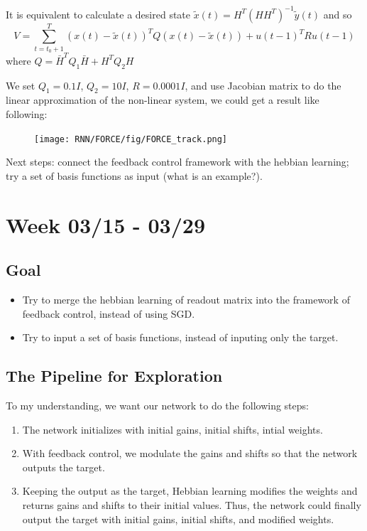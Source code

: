 \documentclass[12pt, a4paper]{article}
\begin{document}
It is equivalent to calculate a desired state $\tilde{x}(t) = H^T(HH^{T})^{-1}\tilde{y}(t)$ and so $$V = \sum_{t=t_0+1}^T (x(t) - \tilde{x}(t))^T Q (x(t)- \tilde{x}(t)) + u(t-1)^T R u(t-1)$$ where $Q=\bar{H}^T Q_1 \bar{H} + H^T Q_2 H$

We set $Q_1 = 0.1I$, $Q_2 = 10I$, $R=0.0001I$, and use Jacobian matrix to do the linear approximation of the non-linear system, we could get a result like following:

\begin{figure}[H]
    \centering
    \texttt{[image: RNN/FORCE/fig/FORCE\_track.png]} \\
\end{figure}

Next steps: connect the feedback control framework with the hebbian learning; try a set of basis functions as input (what is an example?).

\newpage

\section*{Week 03/15 - 03/29}

\subsection*{Goal}

\noindent
\begin{itemize}
    \item Try to merge the hebbian learning of readout matrix into the framework of feedback control, instead of using SGD.
    \item Try to input a set of basis functions, instead of inputing only the target.

\end{itemize}

\newpage

\subsection*{The Pipeline for Exploration}

To my understanding, we want our network to do the following steps:

\begin{enumerate}
    \item The network initializes with initial gains, initial shifts, intial weights.
    \item With feedback control, we modulate the gains and shifts so that the network outputs the target.
    \item Keeping the output as the target, Hebbian learning modifies the weights and returns gains and shifts to their initial values. Thus, the network could finally output the target with initial gains, initial shifts, and modified weights. 
\end{enumerate}
\end{document}
